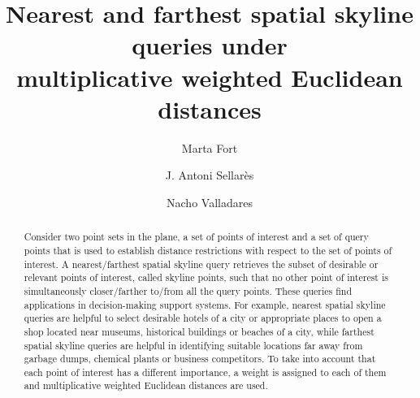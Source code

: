\documentclass[11pt,onecolumn]{elsart3p}
\begin{document}
\begin{frontmatter}



\title{Nearest and farthest spatial skyline queries under \\ multiplicative weighted Euclidean distances}




\author[rvt,rvtt]{Marta Fort}%
\author[rvt]{J. Antoni Sellar\`es}
\author{Nacho Valladares}



\address[rvt]{Graphics and Imaging Laboratory, Universitat de Girona, 17003 Girona, Catalonia,  Spain}
\address[rvtt]{Ci\`encies de la Computaci\'o, Universitat Polit\`ecnica de Catalunya, 08034 Barcelona, Catalonia, Spain}



\begin{abstract}
Consider two point sets in the plane, a set of points of interest and a set of query points that is used to establish distance restrictions with respect to the set of points of interest.
A nearest/farthest spatial skyline query retrieves the subset of desirable or relevant points of interest, called skyline points, such that no other point of interest is simultaneously closer/farther to/from all the query points. These queries find applications in decision-making support systems. For example,   nearest spatial skyline queries are helpful to select desirable hotels of a city or appropriate places to open a shop located near museums, historical buildings or beaches of a city, while farthest spatial skyline queries are helpful in identifying suitable locations far away from garbage dumps, chemical plants or business competitors. To take into account that each point of interest has a different importance, a weight is assigned to each of them and multiplicative weighted Euclidean distances are used.


\end{abstract}
\end{frontmatter}
\end{document}
